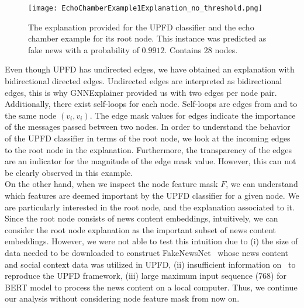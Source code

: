 \begin{figure}
    \centering
    \texttt{[image: EchoChamberExample1Explanation\_no\_threshold.png]}
    \caption[Echo chamber example explanation for root node]{The explanation provided for the UPFD classifier and the echo chamber example for its root node. This instance was predicted as fake news with a probability of $0.9912$. Contains 28 nodes.}
    \label{fig:EchoChamberExample1Explanation_no_threshold}
\end{figure}
Even though UPFD has undirected edges, we have obtained an explanation with bidirectional directed edges. Undirected edges are interpreted as bidirectional edges, this is why GNNExplainer provided us with two edges per node pair. Additionally, there exist self-loops for each node. Self-loops are edges from and to the same node $(v_i, v_i)$. The edge mask values for edges indicate the importance of the messages passed between two nodes. In order to understand the behavior of the UPFD classifier in terms of the root node, we look at the incoming edges to the root node in the explanation. Furthermore, the transparency of the edges are an indicator for the magnitude of the edge mask value. However, this can not be clearly observed in this example.\\
On the other hand, when we inspect the node feature mask $F$, we can understand which features are deemed important by the UPFD classifier for a given node. We are particularly interested in the root node, and the explanation associated to it. Since the root node consists of news content embeddings, intuitively, we can consider the root node explanation as the important subset of news content embeddings. However, we were not able to test this intuition due to (i) the size of data needed to be downloaded to construct FakeNewsNet~\parencite{FakeNewsNet_Shu} whose news content and social context data was utilized in UPFD, (ii) insufficient information on~\cite{UPFD_Dataset_Shu} to reproduce the UPFD framework, (iii) large maximum input sequence (768) for BERT model to process the news content on a local computer. Thus, we continue our analysis without considering node feature mask from now on. \\
